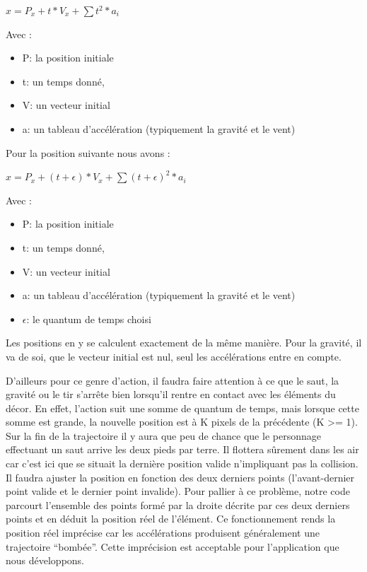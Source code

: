 \documentclass{report}
\begin{document}
$
x = P_{x} + t*V_{x} + \sum t^{2}* a_{i}
$

\bigskip

Avec :
\begin{itemize}
\item P: la position initiale
\item t: un temps donné,
\item V: un vecteur initial 
\item a: un tableau d’accélération (typiquement la gravité et le vent)
\end{itemize}

\bigskip

Pour la position suivante nous avons :

$
x = P_{x} + (t+\epsilon)*V_{x} + \sum (t+\epsilon)^{2}* a_{i}
$
\bigskip

Avec :
\begin{itemize}
\item P: la position initiale
\item t: un temps donné,
\item V: un vecteur initial 
\item a: un tableau d’accélération (typiquement la gravité et le vent)
\item $\epsilon$: le quantum de temps choisi
\end{itemize}

Les positions en y se calculent exactement de la même manière. 
Pour la gravité, il va de soi, que le vecteur initial est nul, seul les accélérations entre en compte. 

D’ailleurs pour ce genre d’action, il faudra faire attention à ce que le saut, la gravité ou le tir s'arrête bien lorsqu’il rentre en contact avec les éléments du décor. En effet, l’action suit une somme de quantum de temps, mais lorsque cette somme est grande, la nouvelle position est à K pixels de la précédente (K >= 1). Sur la fin de la trajectoire il y aura que peu de chance que le personnage effectuant un saut arrive les deux pieds par terre. Il flottera sûrement dans les air car c’est ici que se situait la dernière position valide n’impliquant pas la collision. Il faudra ajuster la position en fonction des deux derniers points (l’avant-dernier point valide et le dernier point invalide). Pour pallier à ce problème, notre code parcourt l’ensemble des points formé par la droite décrite par ces deux derniers points et en déduit la position réel de l’élément.
Ce fonctionnement rends la position réel imprécise car les accélérations produisent généralement une trajectoire “bombée”. Cette imprécision est acceptable pour l’application que nous développons.
\end{document}
